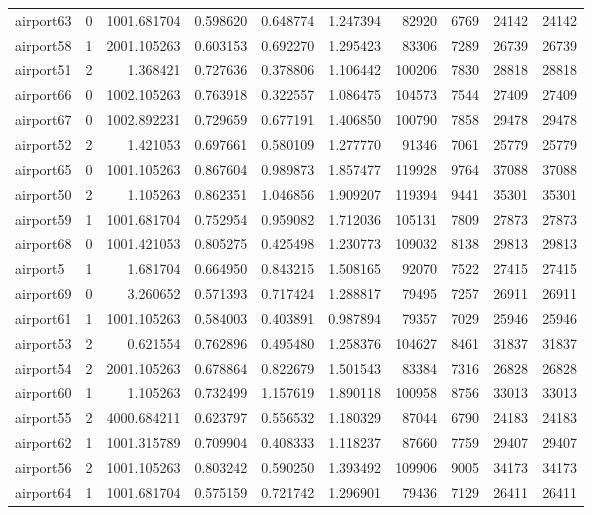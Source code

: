 \begin{longtable}{|l|r|r|r|r|r|r|r|r|r|}
airport63 & 0 & 1001.681704 & 0.598620 & 0.648774 & 1.247394 & 82920 & 6769 & 24142 & 24142 \\
airport58 & 1 & 2001.105263 & 0.603153 & 0.692270 & 1.295423 & 83306 & 7289 & 26739 & 26739 \\
airport51 & 2 & 1.368421 & 0.727636 & 0.378806 & 1.106442 & 100206 & 7830 & 28818 & 28818 \\
airport66 & 0 & 1002.105263 & 0.763918 & 0.322557 & 1.086475 & 104573 & 7544 & 27409 & 27409 \\
airport67 & 0 & 1002.892231 & 0.729659 & 0.677191 & 1.406850 & 100790 & 7858 & 29478 & 29478 \\
airport52 & 2 & 1.421053 & 0.697661 & 0.580109 & 1.277770 & 91346 & 7061 & 25779 & 25779 \\
airport65 & 0 & 1001.105263 & 0.867604 & 0.989873 & 1.857477 & 119928 & 9764 & 37088 & 37088 \\
airport50 & 2 & 1.105263 & 0.862351 & 1.046856 & 1.909207 & 119394 & 9441 & 35301 & 35301 \\
airport59 & 1 & 1001.681704 & 0.752954 & 0.959082 & 1.712036 & 105131 & 7809 & 27873 & 27873 \\
airport68 & 0 & 1001.421053 & 0.805275 & 0.425498 & 1.230773 & 109032 & 8138 & 29813 & 29813 \\
airport5 & 1 & 1.681704 & 0.664950 & 0.843215 & 1.508165 & 92070 & 7522 & 27415 & 27415 \\
airport69 & 0 & 3.260652 & 0.571393 & 0.717424 & 1.288817 & 79495 & 7257 & 26911 & 26911 \\
airport61 & 1 & 1001.105263 & 0.584003 & 0.403891 & 0.987894 & 79357 & 7029 & 25946 & 25946 \\
airport53 & 2 & 0.621554 & 0.762896 & 0.495480 & 1.258376 & 104627 & 8461 & 31837 & 31837 \\
airport54 & 2 & 2001.105263 & 0.678864 & 0.822679 & 1.501543 & 83384 & 7316 & 26828 & 26828 \\
airport60 & 1 & 1.105263 & 0.732499 & 1.157619 & 1.890118 & 100958 & 8756 & 33013 & 33013 \\
airport55 & 2 & 4000.684211 & 0.623797 & 0.556532 & 1.180329 & 87044 & 6790 & 24183 & 24183 \\
airport62 & 1 & 1001.315789 & 0.709904 & 0.408333 & 1.118237 & 87660 & 7759 & 29407 & 29407 \\
airport56 & 2 & 1001.105263 & 0.803242 & 0.590250 & 1.393492 & 109906 & 9005 & 34173 & 34173 \\
airport64 & 1 & 1001.681704 & 0.575159 & 0.721742 & 1.296901 & 79436 & 7129 & 26411 & 26411 \\

\end{longtable}

